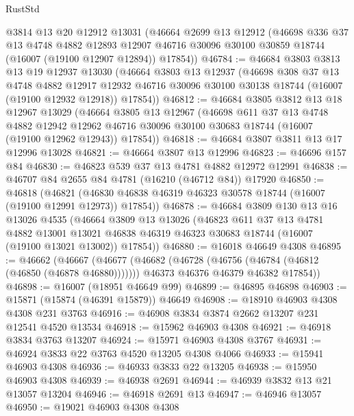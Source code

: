 \begin{lexlean}{RustStd}
\begin{coremodule}
    @3814
    @13
    @20
    @12912
    @13031
    (@46664
      @2699
      @13
      @12912
      (@46698
        @336
        @37
        @13
        @4748
        @4882
        @12893
        @12907
        @46716
        @30096
        @30100
        @30859
        @18744
        (@16007 (@19100 @12907 @12894))
        @17854))
@46784 := @46684
    @3803
    @3813
    @13
    @19
    @12937
    @13030
    (@46664
      @3803
      @13
      @12937
      (@46698
        @308
        @37
        @13
        @4748
        @4882
        @12917
        @12932
        @46716
        @30096
        @30100
        @30138
        @18744
        (@16007 (@19100 @12932 @12918))
        @17854))
@46812 := @46684
    @3805
    @3812
    @13
    @18
    @12967
    @13029
    (@46664
      @3805
      @13
      @12967
      (@46698
        @611
        @37
        @13
        @4748
        @4882
        @12942
        @12962
        @46716
        @30096
        @30100
        @30683
        @18744
        (@16007 (@19100 @12962 @12943))
        @17854))
@46818 := @46684 @3807 @3811 @13 @17 @12996 @13028
@46821 := @46664 @3807 @13 @12996
@46823 := @46696 @157 @84
@46830 := @46823 @539 @37 @13 @4781 @4882 @12972 @12991
@46838 := @46707 @84 @2655 @84 @4781 (@16210 (@46712 @84)) @17920
@46850 := @46818
    (@46821 (@46830 @46838 @46319 @46323 @30578 @18744 (@16007 (@19100 @12991 @12973)) @17854))
@46878 := @46684
    @3809
    @130
    @13
    @16
    @13026
    @4535
    (@46664
      @3809
      @13
      @13026
      (@46823
        @611
        @37
        @13
        @4781
        @4882
        @13001
        @13021
        @46838
        @46319
        @46323
        @30683
        @18744
        (@16007 (@19100 @13021 @13002))
        @17854))
@46880 := @16018 @46649 @4308
@46895 := @46662
    (@46667
      (@46677
        (@46682 (@46728 (@46756 (@46784 (@46812 (@46850 (@46878 @46880)))))))
        @46373
        @46376
        @46379
        @46382
        @17854))
@46898 := @16007 (@18951 @46649 @99)
@46899 := @46895 @46898
@46903 := @15871 (@15874 (@46391 @15879)) @46649
@46908 := @18910 @46903 @4308 @4308 @231 @3763
@46916 := @46908 @3834 @3874 @2662 @13207 @231 @12541 @4520 @13534
@46918 := @15962 @46903 @4308
@46921 := @46918 @3834 @3763 @13207
@46924 := @15971 @46903 @4308 @3767
@46931 := @46924 @3833 @22 @3763 @4520 @13205 @4308 @4066
@46933 := @15941 @46903 @4308
@46936 := @46933 @3833 @22 @13205
@46938 := @15950 @46903 @4308
@46939 := @46938 @2691
@46944 := @46939 @3832 @13 @21 @13057 @13204
@46946 := @46918 @2691 @13
@46947 := @46946 @13057
@46950 := @19021 @46903 @4308 @4308

\end{coremodule}
\end{lexlean}
